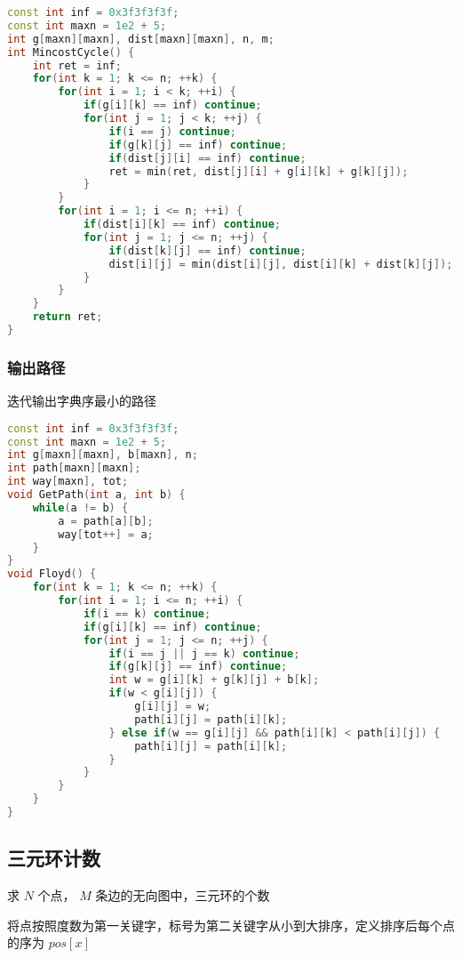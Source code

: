 \begin{lstlisting}[language=C++]
const int inf = 0x3f3f3f3f;
const int maxn = 1e2 + 5;
int g[maxn][maxn], dist[maxn][maxn], n, m;
int MincostCycle() {
    int ret = inf;
    for(int k = 1; k <= n; ++k) {
        for(int i = 1; i < k; ++i) {
            if(g[i][k] == inf) continue;
            for(int j = 1; j < k; ++j) {
                if(i == j) continue;
                if(g[k][j] == inf) continue;
                if(dist[j][i] == inf) continue;
                ret = min(ret, dist[j][i] + g[i][k] + g[k][j]);
            }
        }
        for(int i = 1; i <= n; ++i) {
            if(dist[i][k] == inf) continue;
            for(int j = 1; j <= n; ++j) {
                if(dist[k][j] == inf) continue;
                dist[i][j] = min(dist[i][j], dist[i][k] + dist[k][j]);
            }
        }
    }
    return ret;
}
\end{lstlisting}

\subsubsection{输出路径}

迭代输出字典序最小的路径

\begin{lstlisting}[language=C++]
const int inf = 0x3f3f3f3f;
const int maxn = 1e2 + 5;
int g[maxn][maxn], b[maxn], n;
int path[maxn][maxn];
int way[maxn], tot;
void GetPath(int a, int b) {
    while(a != b) {
        a = path[a][b];
        way[tot++] = a;
    }
}
void Floyd() {
    for(int k = 1; k <= n; ++k) {
        for(int i = 1; i <= n; ++i) {
            if(i == k) continue;
            if(g[i][k] == inf) continue;
            for(int j = 1; j <= n; ++j) {
                if(i == j || j == k) continue;
                if(g[k][j] == inf) continue;
                int w = g[i][k] + g[k][j] + b[k];
                if(w < g[i][j]) {
                    g[i][j] = w;
                    path[i][j] = path[i][k];
                } else if(w == g[i][j] && path[i][k] < path[i][j]) {
                    path[i][j] = path[i][k];
                }
            }
        }
    }
}
\end{lstlisting}

\subsection{三元环计数}

求 $N$ 个点， $M$ 条边的无向图中，三元环的个数

将点按照度数为第一关键字，标号为第二关键字从小到大排序，定义排序后每个点的序为 $pos[x]$


